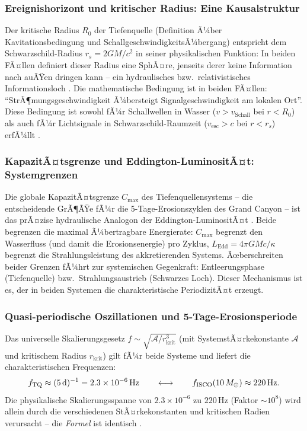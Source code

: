 ﻿\documentclass[12pt,a4paper]{report}
\begin{document}
\subsubsection{Ereignishorizont und kritischer Radius: Eine Kausalstruktur}

Der kritische Radius $R_0$ der Tiefenquelle (Definition Ã¼ber Kavitationsbedingung und SchallgeschwindigkeitsÃ¼bergang) entspricht dem Schwarzschild-Radius $r_s = 2GM/c^2$ in seiner physikalischen Funktion: In beiden FÃ¤llen definiert dieser Radius eine SphÃ¤re, jenseits derer keine Information nach auÃŸen dringen kann -- ein hydraulisches bzw.\ relativistisches Informationsloch \cite{penrose1965,penrose2004}. Die mathematische Bedingung ist in beiden FÃ¤llen: "`StrÃ¶mungsgeschwindigkeit Ã¼bersteigt Signalgeschwindigkeit am lokalen Ort"'. Diese Bedingung ist sowohl fÃ¼r Schallwellen in Wasser ($v > v_{\mathrm{Schall}}$ bei $r < R_0$) als auch fÃ¼r Lichtsignale in Schwarzschild-Raumzeit ($v_{\mathrm{esc}} > c$ bei $r < r_s$) erfÃ¼llt \cite{hawking1975,painleve1921}.

\subsubsection{KapazitÃ¤tsgrenze und Eddington-LuminositÃ¤t: Systemgrenzen}

Die globale KapazitÃ¤tsgrenze $C_{\max}$ des Tiefenquellensystems -- die entscheidende GrÃ¶ÃŸe fÃ¼r die 5-Tage-Erosionszyklen des Grand Canyon -- ist das prÃ¤zise hydraulische Analogon der Eddington-LuminositÃ¤t \cite{eddington1926}. Beide begrenzen die maximal Ã¼bertragbare Energierate: $C_{\max}$ begrenzt den Wasserfluss (und damit die Erosionsenergie) pro Zyklus, $L_{\mathrm{Edd}} = 4\pi GMc/\kappa$ begrenzt die Strahlungsleistung des akkretierenden Systems. Ãœberschreiten beider Grenzen fÃ¼hrt zur systemischen Gegenkraft: Entleerungsphase (Tiefenquelle) bzw.\ Strahlungsaustrieb (Schwarzes Loch). Dieser Mechanismus ist es, der in beiden Systemen die charakteristische PeriodizitÃ¤t erzeugt.

\subsubsection{Quasi-periodische Oszillationen und 5-Tage-Erosionsperiode}

Das universelle Skalierungsgesetz $f \sim \sqrt{\mathcal{A}/r_{\mathrm{krit}}^3}$ (mit SystemstÃ¤rkekonstante $\mathcal{A}$ und kritischem Radius $r_{\mathrm{krit}}$) gilt fÃ¼r beide Systeme und liefert die charakteristischen Frequenzen:
\begin{equation}
	f_{\mathrm{TQ}} \approx (5\,\mathrm{d})^{-1} = 2.3 \times 10^{-6}\,\mathrm{Hz}
	\qquad \longleftrightarrow \qquad
	f_{\mathrm{ISCO}}(10\,M_\odot) \approx 220\,\mathrm{Hz}.
	\notag
\end{equation}
Die physikalische Skalierungsspanne von $2.3 \times 10^{-6}$ zu $220\,\mathrm{Hz}$ (Faktor $\sim 10^8$) wird allein durch die verschiedenen StÃ¤rkekonstanten und kritischen Radien verursacht -- die \emph{Formel} ist identisch \cite{strohmayer2001}.
\end{document}
